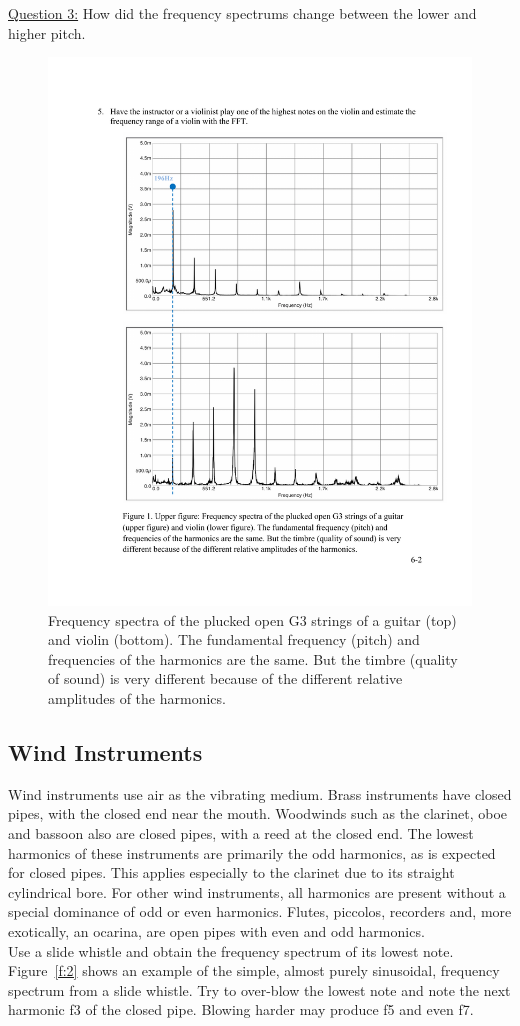 \documentclass[11pt]{NSF}
\begin{document}
\underline{Question 3:} How did the frequency spectrums change between the lower and higher pitch.
%
\begin{figure}[hbtp]
\begin{center}
\includegraphics[width=.6\textwidth]{fig6_1}
\caption{Frequency spectra of the plucked open G3 strings of a guitar
(top) and violin (bottom). The fundamental frequency
(pitch) and frequencies of the harmonics are the same. But the timbre
(quality of sound) is very different because of the different relative
amplitudes of the harmonics.}
\label{f:1}
\end{center}
\end{figure}


\subsection{Wind Instruments} 
Wind instruments use air as the vibrating medium. Brass instruments
have closed pipes, with the closed end near the mouth. Woodwinds such
as the clarinet, oboe and bassoon also are closed pipes, with a reed
at the closed end. The lowest harmonics of these instruments are
primarily the odd harmonics, as is expected for closed pipes. This
applies especially to the clarinet due to its straight cylindrical
bore. For other wind instruments, all harmonics are present without a
special dominance of odd or even harmonics. Flutes, piccolos,
recorders and, more exotically, an ocarina, are open pipes with even
and odd harmonics.  \\

Use a slide whistle and obtain the frequency spectrum of its lowest note.
Figure~\ref{f:2} shows an example of the simple, almost purely sinusoidal, frequency
spectrum from a slide whistle. Try to over-blow the lowest note and note the next
harmonic f3 of the closed pipe. Blowing harder may produce f5 and even f7.
\end{document}
